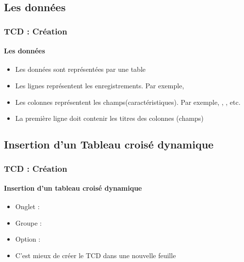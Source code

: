 \documentclass[xcolor=table, usenames,dvipsnames]{beamer}
\begin{document}
\subsection{Les données}

\begin{frame}
\frametitle{TCD : Création}
\framesubtitle{Les données}

\begin{minipage}{0.49\textwidth}
	\begin{itemize}
		\item Les données sont représentées par une table 
		\item Les lignes représentent  les enregistrements. Par exemple, 
		\item Les colonnes représentent les champs(caractéristiques). Par exemple, , , etc.
		\item La première ligne doit contenir les titres des colonnes (champs)
	\end{itemize}
\end{minipage}
%
\begin{minipage}{0.5\textwidth} 
\end{minipage}

\end{frame}

\subsection{Insertion d'un Tableau croisé dynamique}

\begin{frame}
\frametitle{TCD : Création}
\framesubtitle{Insertion d'un tableau croisé dynamique}

\begin{minipage}{0.69\textwidth}
	\begin{itemize}
		\item Onglet : 
		\item Groupe : 
		\item Option : 
		\item C'est mieux de créer le TCD dans une nouvelle feuille 
	\end{itemize}
\end{minipage}
%
\begin{minipage}{0.3\textwidth} 
\end{minipage}

\begin{flushright}
\end{flushright}

\end{frame}
\end{document}
